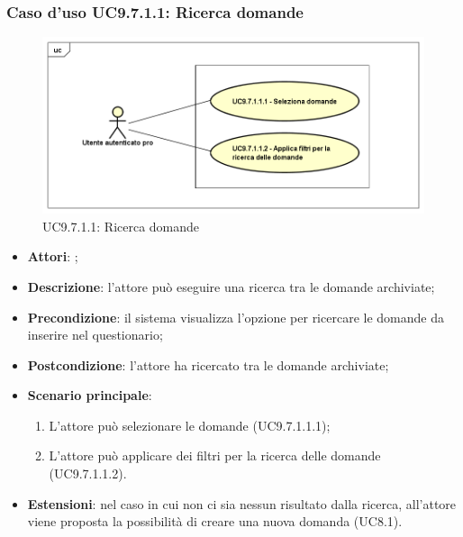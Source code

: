 			 \subsubsection{Caso d'uso UC9.7.1.1: Ricerca domande}
			 \label{UC9.7.1.1}
			 \begin{figure}[h]
			 	\centering
			 	\includegraphics[scale=0.5,keepaspectratio]{UML/UC9_7_1_1.png}
			 	\caption{UC9.7.1.1: Ricerca domande}
			 \end{figure}
			 \FloatBarrier
			 \begin{itemize}
			 	\item \textbf{Attori}: \uaupro{};
			 	\item \textbf{Descrizione}: l'attore può eseguire una ricerca tra le domande archiviate; 
			 	\item \textbf{Precondizione}: il sistema visualizza l'opzione per ricercare le domande da inserire nel questionario;
			 	\item \textbf{Postcondizione}: l'attore ha ricercato tra le domande archiviate;
			 	\item \textbf{Scenario principale}:
			 	\begin{enumerate}
			 		\item L'attore può selezionare le domande (UC9.7.1.1.1); 
			 		\item L'attore può applicare dei filtri per la ricerca delle domande (UC9.7.1.1.2).
			 	\end{enumerate}
			 	\item \textbf{Estensioni}: nel caso in cui non ci sia nessun risultato dalla ricerca, all'attore viene proposta la possibilità di creare una nuova domanda (UC8.1).
			 \end{itemize}
			 
